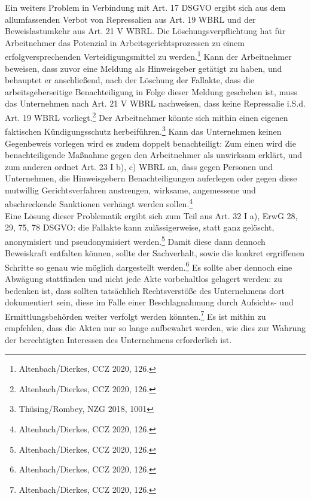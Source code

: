 Ein weiters Problem in Verbindung mit Art. 17 DSGVO ergibt sich aus dem allumfassenden Verbot von Repressalien aus Art. 19 WBRL und der Beweislastumkehr aus Art. 21 V WBRL.
Die Löschungsverpflichtung hat für Arbeitnehmer das Potenzial in Arbeitsgerichtsprozessen zu einem erfolgversprechenden Verteidigungsmittel zu werden.\footnote{Altenbach/Dierkes, CCZ 2020, 126.}
Kann der Arbeitnehmer beweisen, dass zuvor eine Meldung als Hinweisgeber getätigt zu haben, und behauptet er anschließend, nach der Löschung der Fallakte, dass die arbeitsgeberseitige Benachteiligung in Folge dieser Meldung geschehen ist, muss das Unternehmen nach Art. 21 V WBRL nachweisen, dass keine Repressalie i.S.d. Art. 19 WBRL vorliegt.\footnote{Altenbach/Dierkes, CCZ 2020, 126.}
Der Arbeitnehmer könnte sich mithin einen eigenen faktischen Kündigungsschutz herbeiführen.\footnote{Thüsing/Rombey, NZG 2018, 1001}
Kann das Unternehmen keinen Gegenbeweis vorlegen wird es zudem doppelt benachteiligt: Zum einen wird die benachteiligende Maßnahme gegen den Arbeitnehmer als unwirksam erklärt, und zum anderen ordnet Art. 23 I b), c) WBRL an, dass gegen Personen und Unternehmen, die Hinweisgebern Benachteiligungen auferlegen oder gegen diese mutwillig Gerichtsverfahren anstrengen, wirksame, angemessene und abschreckende Sanktionen verhängt werden sollen.\footnote{Altenbach/Dierkes, CCZ 2020, 126.}\\
Eine Lösung dieser Problematik ergibt sich zum Teil aus Art. 32 I a), ErwG 28, 29, 75, 78 DSGVO: die Fallakte kann zulässigerweise, statt ganz gelöscht, anonymisiert und pseudonymisiert werden.\footnote{Altenbach/Dierkes, CCZ 2020, 126.}
Damit diese dann dennoch Beweiskraft entfalten können, sollte der Sachverhalt, sowie die konkret ergriffenen Schritte so genau wie möglich dargestellt werden.\footnote{Altenbach/Dierkes, CCZ 2020, 126.}
Es sollte aber dennoch eine Abwägung stattfinden und nicht jede Akte vorbehaltlos gelagert werden: zu bedenken ist, dass sollten tatsächlich Rechtsverstöße des Unternehmens dort dokumentiert sein,  diese im Falle einer Beschlagnahmung durch Aufsichts- und Ermittlungsbehörden weiter verfolgt werden könnten.\footnote{Altenbach/Dierkes, CCZ 2020, 126.}
Es ist mithin zu empfehlen, dass die Akten nur so lange aufbewahrt werden, wie dies zur Wahrung der berechtigten Interessen des Unternehmens erforderlich ist.



